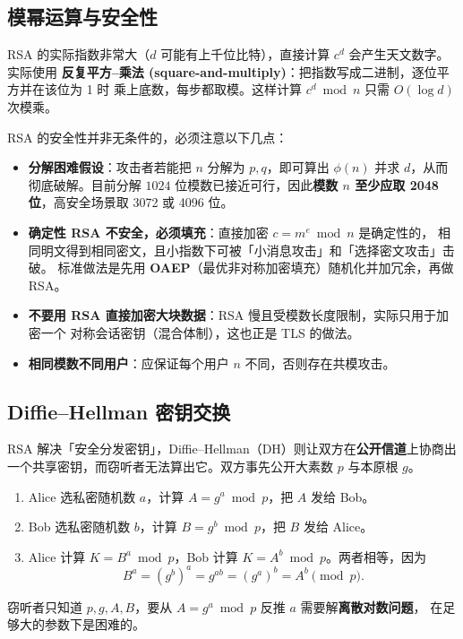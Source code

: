\subsection{模幂运算与安全性}

RSA 的实际指数非常大（$d$ 可能有上千位比特），直接计算 $c^d$ 会产生天文数字。实际使用
\textbf{反复平方--乘法 (square-and-multiply)}：把指数写成二进制，逐位平方并在该位为 1 时
乘上底数，每步都取模。这样计算 $c^d \bmod n$ 只需 $O(\log d)$ 次模乘。

RSA 的安全性并非无条件的，必须注意以下几点：

\begin{itemize}
    \item \textbf{分解困难假设}：攻击者若能把 $n$ 分解为 $p,q$，即可算出 $\phi(n)$ 并求
    $d$，从而彻底破解。目前分解 $1024$ 位模数已接近可行，因此\textbf{模数 $n$ 至少应取
    2048 位}，高安全场景取 3072 或 4096 位。
    \item \textbf{确定性 RSA 不安全，必须填充}：直接加密 $c=m^e\bmod n$ 是确定性的，
    相同明文得到相同密文，且小指数下可被「小消息攻击」和「选择密文攻击」击破。
    标准做法是先用 \textbf{OAEP}（最优非对称加密填充）随机化并加冗余，再做 RSA。
    \item \textbf{不要用 RSA 直接加密大块数据}：RSA 慢且受模数长度限制，实际只用于加密一个
    对称会话密钥（混合体制），这也正是 TLS 的做法。
    \item \textbf{相同模数不同用户}：应保证每个用户 $n$ 不同，否则存在共模攻击。
\end{itemize}

\subsection{Diffie--Hellman 密钥交换}

RSA 解决「安全分发密钥」，Diffie--Hellman（DH）则让双方在\textbf{公开信道}上协商出
一个共享密钥，而窃听者无法算出它。双方事先公开大素数 $p$ 与本原根 $g$。

\begin{enumerate}
    \item Alice 选私密随机数 $a$，计算 $A = g^{a} \bmod p$，把 $A$ 发给 Bob。
    \item Bob 选私密随机数 $b$，计算 $B = g^{b} \bmod p$，把 $B$ 发给 Alice。
    \item Alice 计算 $K = B^{a} \bmod p$，Bob 计算 $K = A^{b} \bmod p$。两者相等，因为
    \begin{equation}
        B^{a} = (g^{b})^{a} = g^{ab} = (g^{a})^{b} = A^{b} \pmod{p}.
        \label{eq:dh}
    \end{equation}
\end{enumerate}
窃听者只知道 $p,g,A,B$，要从 $A=g^{a}\bmod p$ 反推 $a$ 需要解\textbf{离散对数问题}，
在足够大的参数下是困难的。


